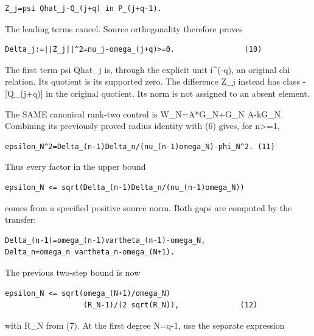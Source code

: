 \begin{Verbatim}[breaklines=true,breakanywhere=true,fontsize=\small]
Z_j=psi Qhat_j-Q_(j+q) in P_(j+q-1).
\end{Verbatim}

The leading terms cancel. Source orthogonality therefore proves

\begin{Verbatim}[breaklines=true,breakanywhere=true,fontsize=\small]
Delta_j:=||Z_j||^2=nu_j-omega_(j+q)>=0.                (10)
\end{Verbatim}

The first term psi Qhat\_j is, through the explicit unit i\^{}(-q), an
original chi relation. Its quotient is its supported zero. The
difference Z\_j instead has class -{[}Q\_(j+q){]} in the original
quotient. Its norm is not assigned to an absent element.

The SAME canonical rank-two control is W\_N=A*G\_N+G\_N A-kG\_N.
Combining its previously proved radius identity with (6) gives, for
n\textgreater=1,

\begin{Verbatim}[breaklines=true,breakanywhere=true,fontsize=\small]
epsilon_N^2=Delta_(n-1)Delta_n/(nu_(n-1)omega_N)-phi_N^2. (11)
\end{Verbatim}

Thus every factor in the upper bound

\begin{Verbatim}[breaklines=true,breakanywhere=true,fontsize=\small]
epsilon_N <= sqrt(Delta_(n-1)Delta_n/(nu_(n-1)omega_N))
\end{Verbatim}

comes from a specified positive source norm. Both gaps are computed by
the transfer:

\begin{Verbatim}[breaklines=true,breakanywhere=true,fontsize=\small]
Delta_(n-1)=omega_(n-1)vartheta_(n-1)-omega_N,
Delta_n=omega_n vartheta_n-omega_(N+1).
\end{Verbatim}

The previous two-step bound is now

\begin{Verbatim}[breaklines=true,breakanywhere=true,fontsize=\small]
epsilon_N <= sqrt(omega_(N+1)/omega_N)
                  (R_N-1)/(2 sqrt(R_N)),              (12)
\end{Verbatim}

with R\_N from (7). At the first degree N=q-1, use the separate
expression

